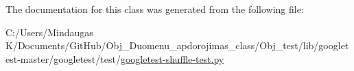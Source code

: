 The documentation for this class was generated from the following file\+:\begin{DoxyCompactItemize}
\item 
C\+:/\+Users/\+Mindaugas K/\+Documents/\+Git\+Hub/\+Obj\+\_\+\+Duomenu\+\_\+apdorojimas\+\_\+class/\+Obj\+\_\+test/lib/googletest-\/master/googletest/test/\mbox{\hyperlink{_obj__test_2lib_2googletest-master_2googletest_2test_2googletest-shuffle-test_8py}{googletest-\/shuffle-\/test.\+py}}\end{DoxyCompactItemize}
